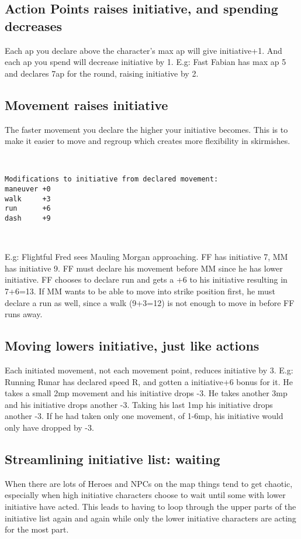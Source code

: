 \subsection*{Action Points raises initiative, and spending decreases}
Each ap you declare above the character's max ap will give initiative+1. And each ap you spend will decrease initiative by 1. E.g: Fast Fabian has max ap 5 and declares 7ap for the round, raising initiative by 2.


\subsection*{Movement raises initiative}
The faster movement you declare the higher your initiative becomes. This is to make it easier to move and regroup which creates more flexibility in skirmishes.

\

\begin{verbatim}
Modifications to initiative from declared movement:
maneuver +0
walk     +3
run      +6
dash     +9
\end{verbatim}

\

E.g: Flightful Fred sees Mauling Morgan approaching. FF has initiative 7, MM has initiative 9. FF must declare his movement before MM since he has lower initiative. FF chooses to declare run and gets a +6 to his initiative resulting in 7+6=13. If MM wants to be able to move into strike position first, he must declare a run as well, since a walk (9+3=12) is not enough to move in before FF runs away.


\subsection*{Moving lowers initiative, just like actions}
\label{sec:movinglowersinitiative}
Each initiated movement, not each movement point, reduces initiative by 3. E.g: Running Runar has declared speed R, and gotten a initiative+6 bonus for it. He takes a small 2mp movement and his initiative drops -3. He takes another 3mp and his initiative drops another -3. Taking his last 1mp his initiative drops another -3. If he had taken only one movement, of 1-6mp, his initiative would only have dropped by -3.


\subsection*{Streamlining initiative list: waiting}
When there are lots of Heroes and NPCs on the map things tend to get chaotic, especially when high initiative characters choose to wait until some with lower initiative have acted. This leads to having to loop through the upper parts of the initiative list again and again while only the lower initiative characters are acting for the most part.

